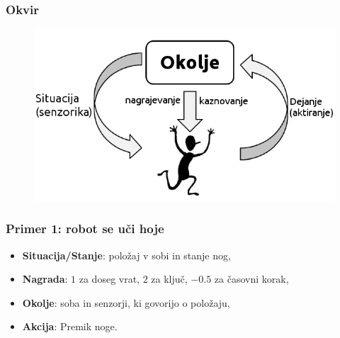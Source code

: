 \documentclass{beamer}    %
\begin{document}
\begin{frame}
    \frametitle{Okvir}
    \begin{figure}
        \includegraphics[scale=0.5]{slike/RLloop.png}
    \end{figure}
\end{frame}


\begin{frame}
    \frametitle{Primer 1: robot se uči hoje}
    \begin{itemize}
        \item \textbf{Situacija/Stanje}: položaj v sobi in stanje nog,
        \item \textbf{Nagrada}: $1$ za doseg vrat, $2$ za ključ, $-0.5$ za časovni korak,
        \item \textbf{Okolje}: soba in senzorji, ki govorijo o položaju,
        \item \textbf{Akcija}: Premik noge.
    \end{itemize}
\end{frame}
\end{document}
